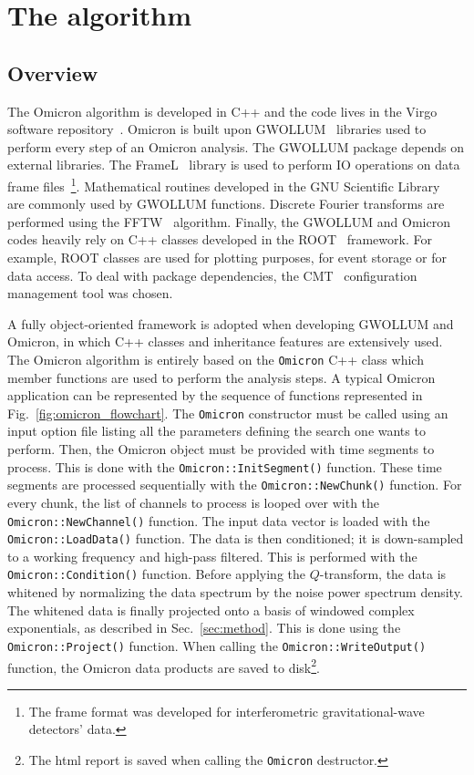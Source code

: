 \section{The algorithm} \label{sec:algorithm}

\subsection{Overview} \label{sec:algorithm:overview}
The Omicron algorithm is developed in C++ and the code lives in the Virgo software repository~\cite{VirgoSVN}. Omicron is built upon GWOLLUM~\cite{GWOLLUM} libraries used to perform every step of an Omicron analysis. The GWOLLUM package depends on external libraries. The FrameL~\cite{FrameL} library is used to perform IO operations on data frame files~\footnote{The frame format was developed for interferometric gravitational-wave detectors' data.}. Mathematical routines developed in the GNU Scientific Library~\cite{GSL} are commonly used by GWOLLUM functions. Discrete Fourier transforms are performed using the FFTW~\cite{FFTW} algorithm. Finally, the GWOLLUM and Omicron codes heavily rely on C++ classes developed in the ROOT~\cite{Brun:1997pa} framework. For example, ROOT classes are used for plotting purposes, for event storage or for data access. To deal with package dependencies, the CMT~\cite{CMT} configuration management tool was chosen.

A fully object-oriented framework is adopted when developing GWOLLUM and Omicron, in which C++ classes and inheritance features are extensively used. The Omicron algorithm is entirely based on the \texttt{Omicron} C++ class which member functions are used to perform the analysis steps. A typical Omicron application can be represented by the sequence of functions represented in Fig.~\ref{fig:omicron_flowchart}. The \texttt{Omicron} constructor must be called using an input option file listing all the parameters defining the search one wants to perform. Then, the Omicron object must be provided with time segments to process. This is done with the \texttt{Omicron::InitSegment()} function. These time segments are processed sequentially with the \texttt{Omicron::NewChunk()} function. For every chunk, the list of channels to process is looped over with the \texttt{Omicron::NewChannel()} function. The input data vector is loaded with the \texttt{Omicron::LoadData()} function. The data is then conditioned; it is down-sampled to a working frequency and high-pass filtered. This is performed with the  \texttt{Omicron::Condition()} function. Before applying the $Q$-transform, the data is whitened by normalizing the data spectrum by the noise power spectrum density. The whitened data is finally projected onto a basis of windowed complex exponentials, as described in Sec.~\ref{sec:method}. This is done using the \texttt{Omicron::Project()} function. When calling the \texttt{Omicron::WriteOutput()} function, the Omicron data products are saved to disk\footnote{The html report is saved when calling the \texttt{Omicron} destructor.}.

